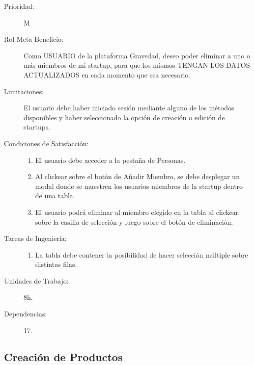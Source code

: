 \begin{description}
    \item[Prioridad:] M
    \item[Rol-Meta-Beneficio:]  Como USUARIO de la plataforma Gravedad, deseo poder eliminar a uno o más miembros de mi startup, para que los mismos TENGAN LOS DATOS ACTUALIZADOS en cada momento que sea necesario.
    \item[Limitaciones:]  El usuario debe haber iniciado sesión mediante alguno de los métodos disponibles y haber seleccionado la opción de creación o edición de startups.
    \item[Condiciones de Satisfacción:]  \hfill
        \begin{enumerate}
            \item El usuario debe acceder a la pestaña de Personas.
    		\item Al clickear sobre el botón de Añadir Miembro, se debe desplegar un modal donde se muestren los usuarios miembros de la startup dentro de una tabla.
    		\item El usuario podrá eliminar al miembro elegido en la tabla al clickear sobre la casilla de selección y luego sobre el botón de eliminación.
        \end{enumerate}
    \item[Tareas de Ingeniería:]  \hfill
        \begin{enumerate}
            \item La tabla debe contener la posibilidad de hacer selección múltiple sobre distintas filas.
        \end{enumerate}
    \item[Unidades de Trabajo:] 8h.
    \item[Dependencias:] 17.
\end{description}

\newpage


\subsection{Creación de Productos}

